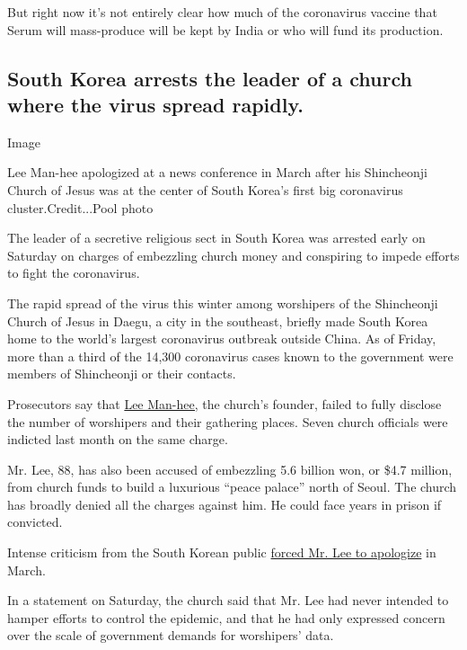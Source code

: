 But right now it's not entirely clear how much of the coronavirus
vaccine that Serum will mass-produce will be kept by India or who will
fund its production.

\hypertarget{south-korea-arrests-the-leader-of-a-church-where-the-virus-spread-rapidly}{%
\subsection{South Korea arrests the leader of a church where the virus
spread
rapidly.}\label{south-korea-arrests-the-leader-of-a-church-where-the-virus-spread-rapidly}}

Image

Lee Man-hee apologized at a news conference in March after his
Shincheonji Church of Jesus was at the center of South Korea's first big
coronavirus cluster.Credit...Pool photo

The leader of a secretive religious sect in South Korea was arrested
early on Saturday on charges of embezzling church money and conspiring
to impede efforts to fight the coronavirus.

The rapid spread of the virus this winter among worshipers of the
Shincheonji Church of Jesus in Daegu, a city in the southeast, briefly
made South Korea home to the world's largest coronavirus outbreak
outside China. As of Friday, more than a third of the 14,300 coronavirus
cases known to the government were members of Shincheonji or their
contacts.

Prosecutors say that
\href{https://www.nytimes3xbfgragh.onion/2020/03/02/world/asia/coronavirus-south-korea-shincheonji.html?searchResultPosition=1}{Lee
Man-hee,} the church's founder, failed to fully disclose the number of
worshipers and their gathering places. Seven church officials were
indicted last month on the same charge.

Mr. Lee, 88, has also been accused of embezzling 5.6 billion won, or
\$4.7 million, from church funds to build a luxurious ``peace palace''
north of Seoul. The church has broadly denied all the charges against
him. He could face years in prison if convicted.

Intense criticism from the South Korean public
\href{https://www.nytimes3xbfgragh.onion/2020/03/02/world/asia/coronavirus-south-korea-shincheonji.html}{forced
Mr. Lee to apologize} in March.

In a statement on Saturday, the church said that Mr. Lee had never
intended to hamper efforts to control the epidemic, and that he had only
expressed concern over the scale of government demands for worshipers'
data.

